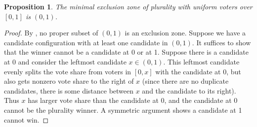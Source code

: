 \documentclass{article}
\theoremstyle{theorem}
\newtheorem{proposition}{Proposition}
\theoremstyle{definition}
\begin{document}
\begin{proposition}
  The minimal exclusion zone of plurality with uniform voters over $[0, 1]$ is $(0, 1)$. 
\end{proposition}
\begin{proof}
  By \cite[Theorem 2]{tomlinson2024moderating}, no proper subset of $(0, 1)$ is an exclusion zone. Suppose we have a candidate configuration with at least one candidate in $(0, 1)$. It suffices to show that the winner cannot be a candidate at 0 or at 1. Suppose there is a candidate at 0 and consider the leftmost candidate $x \in (0, 1)$. This leftmost candidate evenly splits the vote share from voters in $[0, x]$ with the candidate at $0$, but also gets nonzero vote share to the right of $x$ (since there are no duplicate candidates, there is some distance between $x$ and the candidate to its right). Thus $x$ has larger vote share than the candidate at 0, and the candidate at 0 cannot be the plurality winner. A symmetric argument shows a candidate at 1 cannot win.
\end{proof}
\end{document}
